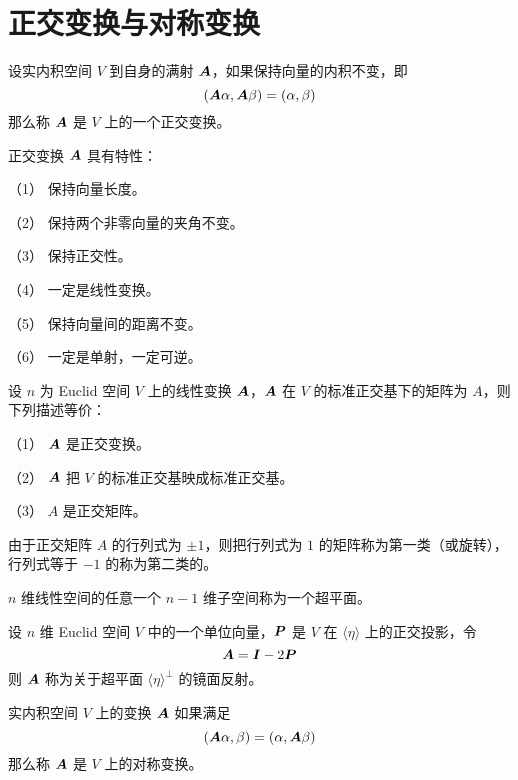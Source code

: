 \section{正交变换与对称变换}

\begin{definition}
    设实内积空间 $V$ 到自身的满射 $\boldsymbol{A}$，如果保持向量的内积不变，即
    \[ (\boldsymbol{A}\alpha,\boldsymbol{A}\beta) = (\alpha,\beta) \]
    那么称 $\boldsymbol{A}$ 是 $V$ 上的一个正交变换。
\end{definition}

\begin{proposition}
    正交变换 $\boldsymbol{A}$ 具有特性：
    
    （1） 保持向量长度。
    
    （2） 保持两个非零向量的夹角不变。
    
    （3） 保持正交性。
    
    （4） 一定是线性变换。
    
    （5） 保持向量间的距离不变。
    
    （6） 一定是单射，一定可逆。
\end{proposition}

\begin{theorem}
    设 $n$ 为 Euclid 空间 $V$ 上的线性变换 $\boldsymbol{A}$，$\boldsymbol{A}$ 在 $V$ 的标准正交基下的矩阵为 $A$，则下列描述等价：
    
    （1） $\boldsymbol{A}$ 是正交变换。
    
    （2） $\boldsymbol{A}$ 把 $V$ 的标准正交基映成标准正交基。
    
    （3） $A$ 是正交矩阵。
\end{theorem}

由于正交矩阵 $A$ 的行列式为 $\pm 1$，则把行列式为 $1$ 的矩阵称为第一类（或旋转），行列式等于 $-1$ 的称为第二类的。

$n$ 维线性空间的任意一个 $n-1$ 维子空间称为一个超平面。

\begin{definition}
    设 $n$ 维 Euclid 空间 $V$ 中的一个单位向量，$\boldsymbol{P}$ 是 $V$ 在 $\langle \eta \rangle$ 上的正交投影，令
    \[ \boldsymbol{A} = \boldsymbol{I} - 2 \boldsymbol{P} \]
    则 $\boldsymbol{A}$ 称为关于超平面 $\langle \eta \rangle^\bot$ 的镜面反射。
\end{definition}

\begin{definition}
    实内积空间 $V$ 上的变换 $\boldsymbol{A}$ 如果满足
    \[ (\boldsymbol{A}\alpha,\beta) = (\alpha,\boldsymbol{A}\beta) \]
    那么称 $\boldsymbol{A}$ 是 $V$ 上的对称变换。
\end{definition}

